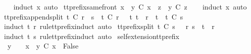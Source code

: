\begin{isabellebody}
%
\isadelimproof
\ \ %
\endisadelimproof
%
\isatagproof
{}\isamarkupfalse%
\ {\isacharparenleft}induct\ x{\isacharcomma}\ auto{\isacharparenright}%
\endisatagproof
{\isafoldproof}%
%
\isadelimproof
\isanewline
%
\endisadelimproof
\isanewline
{}\isamarkupfalse%
\ tt{\isacharunderscore}prefix{\isacharunderscore}same{\isacharunderscore}front{\isacharcolon}\ {\isachardoublequoteopen}{\isacharparenleft}x\ {\isacharat}\ y\ {\isasymle}\isactrlsub C\ x\ {\isacharat}\ z{\isacharparenright}\ {\isacharequal}\ {\isacharparenleft}y\ {\isasymle}\isactrlsub C\ z{\isacharparenright}{\isachardoublequoteclose}\isanewline
%
\isadelimproof
\ \ %
\endisadelimproof
%
\isatagproof
{}\isamarkupfalse%
\ {\isacharparenleft}induct\ x{\isacharcomma}\ auto{\isacharparenright}%
\endisatagproof
{\isafoldproof}%
%
\isadelimproof
\isanewline
%
\endisadelimproof
\isanewline
{}\isamarkupfalse%
\ tt{\isacharunderscore}prefix{\isacharunderscore}append{\isacharunderscore}split{\isacharcolon}\ {\isachardoublequoteopen}t\ {\isasymle}\isactrlsub C\ r\ {\isacharat}\ s\ {\isasymLongrightarrow}\ t\ {\isasymle}\isactrlsub C\ r\ {\isasymor}\ {\isacharparenleft}{\isasymexists}\ t{\isacharprime}{\isachardot}\ t\ {\isacharequal}\ r\ {\isacharat}\ t{\isacharprime}\ {\isasymand}\ t{\isacharprime}\ {\isasymle}\isactrlsub C\ s{\isacharparenright}{\isachardoublequoteclose}\isanewline
%
\isadelimproof
\ \ %
\endisadelimproof
%
\isatagproof
{}\isamarkupfalse%
\ {\isacharparenleft}induct\ t\ r\ rule{\isacharcolon}tt{\isacharunderscore}prefix{\isachardot}induct{\isacharcomma}\ auto{\isacharparenright}%
\endisatagproof
{\isafoldproof}%
%
\isadelimproof
\isanewline
%
\endisadelimproof
\isanewline
{}\isamarkupfalse%
\ tt{\isacharunderscore}prefix{\isacharunderscore}split{\isacharcolon}\ {\isachardoublequoteopen}t\ {\isasymle}\isactrlsub C\ s\ {\isasymLongrightarrow}\ {\isasymexists}\ r{\isachardot}\ s\ {\isacharequal}\ t\ {\isacharat}\ r{\isachardoublequoteclose}\isanewline
%
\isadelimproof
\ \ %
\endisadelimproof
%
\isatagproof
{}\isamarkupfalse%
\ {\isacharparenleft}induct\ t\ s\ rule{\isacharcolon}tt{\isacharunderscore}prefix{\isachardot}induct{\isacharcomma}\ auto{\isacharparenright}%
\endisatagproof
{\isafoldproof}%
%
\isadelimproof
\isanewline
%
\endisadelimproof
\isanewline
{}\isamarkupfalse%
\ self{\isacharunderscore}extension{\isacharunderscore}tt{\isacharunderscore}prefix{\isacharcolon}\ \isanewline
\ \ {\isachardoublequoteopen}y\ {\isasymnoteq}\ {\isacharbrackleft}{\isacharbrackright}\ {\isasymLongrightarrow}\ x\ {\isacharat}\ y\ {\isasymle}\isactrlsub C\ x\ {\isasymLongrightarrow}\ False{\isachardoublequoteclose}\isanewline

\end{isabellebody}
